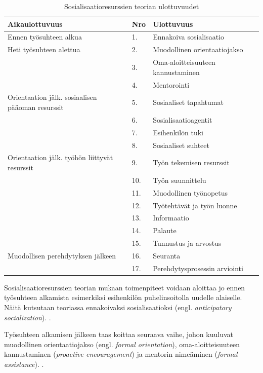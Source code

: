 \documentclass[utf8]{gradu3}
\begin{document}
\begin{table}[h]
    \begin{tabular}{llll}
        \toprule
        \textbf{Aikaulottuvuus} & \textbf{Nro} & \textbf{Ulottuvuus} \\
        \toprule
        Ennen työsuhteen alkua & 1. & Ennakoiva sosialisaatio \\
        \midrule
        Heti työsuhteen alettua & 2. & Muodollinen orientaatiojakso \\
        & 3. & Oma-aloitteisuuteen kannustaminen \\
        & 4. & Mentorointi \\
        \midrule
        Orientaation jälk. sosiaalisen pääoman resurssit & 5. & Sosiaaliset tapahtumat \\
        & 6. & Sosialisaatioagentit \\
        & 7. & Esihenkilön tuki \\
        & 8. & Sosiaaliset suhteet \\
        \midrule
        Orientaation jälk. työhön liittyvät resurssit & 9. & Työn tekemisen resurssit \\
        & 10. & Työn suunnittelu \\
        & 11. & Muodollinen työnopetus \\
        & 12. & Työtehtävät ja työn luonne \\
        & 13. & Informaatio \\
        & 14. & Palaute \\
        & 15. & Tunnustus ja arvostus \\
        \midrule
        Muodollisen perehdytyksen jälkeen & 16. & Seuranta \\
        & 17. & Perehdytysprosessin arviointi \\
        \bottomrule
    \end{tabular}
    \caption{Sosialisaatioresurssien teorian ulottuvuudet \parencite{saks-gruman-2012}}
    \label{tbl:srt-ulottuvuudet}
\end{table}

Sosialisaatioresurssien teorian mukaan toimenpiteet voidaan aloittaa jo ennen työsuhteen alkamista esimerkiksi esihenkilön puhelinsoitolla uudelle alaiselle. Näitä kutsutaan teoriassa ennakoivaksi sosialisaatioksi (engl. \textit{anticipatory socialization}). \parencite{saks-gruman-2012}.

Työsuhteen alkamisen jälkeen taas koittaa seuraava vaihe, johon kuuluvat muodollinen orientaatiojakso (engl. \textit{formal orientation}), oma-aloitteisuuteen kannustaminen (\textit{proactive encouragement}) ja mentorin nimeäminen (\textit{formal assistance}). \parencite{saks-gruman-2012}.
\end{document}
